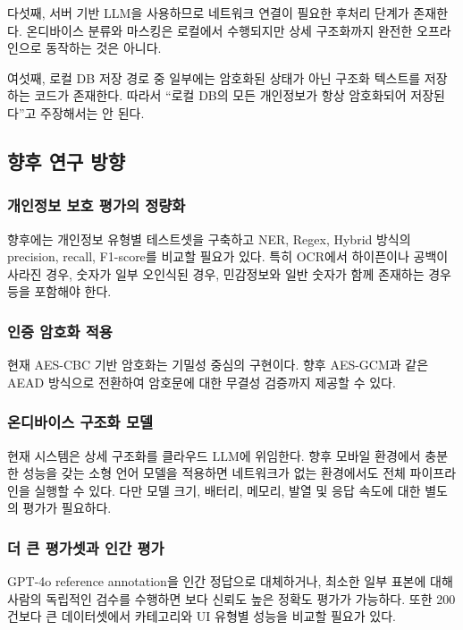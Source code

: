 \documentclass[11pt,a4paper]{article}
\begin{document}
다섯째, 서버 기반 LLM을 사용하므로 네트워크 연결이 필요한 후처리 단계가 존재한다. 온디바이스 분류와 마스킹은 로컬에서 수행되지만 상세 구조화까지 완전한 오프라인으로 동작하는 것은 아니다.

여섯째, 로컬 DB 저장 경로 중 일부에는 암호화된 상태가 아닌 구조화 텍스트를 저장하는 코드가 존재한다. 따라서 ``로컬 DB의 모든 개인정보가 항상 암호화되어 저장된다''고 주장해서는 안 된다.

\subsection{향후 연구 방향}

\subsubsection{개인정보 보호 평가의 정량화}

향후에는 개인정보 유형별 테스트셋을 구축하고 NER, Regex, Hybrid 방식의 precision, recall, F1-score를 비교할 필요가 있다. 특히 OCR에서 하이픈이나 공백이 사라진 경우, 숫자가 일부 오인식된 경우, 민감정보와 일반 숫자가 함께 존재하는 경우 등을 포함해야 한다.

\subsubsection{인증 암호화 적용}

현재 AES-CBC 기반 암호화는 기밀성 중심의 구현이다. 향후 AES-GCM과 같은 AEAD 방식으로 전환하여 암호문에 대한 무결성 검증까지 제공할 수 있다.

\subsubsection{온디바이스 구조화 모델}

현재 시스템은 상세 구조화를 클라우드 LLM에 위임한다. 향후 모바일 환경에서 충분한 성능을 갖는 소형 언어 모델을 적용하면 네트워크가 없는 환경에서도 전체 파이프라인을 실행할 수 있다. 다만 모델 크기, 배터리, 메모리, 발열 및 응답 속도에 대한 별도의 평가가 필요하다.

\subsubsection{더 큰 평가셋과 인간 평가}

GPT-4o reference annotation을 인간 정답으로 대체하거나, 최소한 일부 표본에 대해 사람의 독립적인 검수를 수행하면 보다 신뢰도 높은 정확도 평가가 가능하다. 또한 200건보다 큰 데이터셋에서 카테고리와 UI 유형별 성능을 비교할 필요가 있다.
\end{document}
